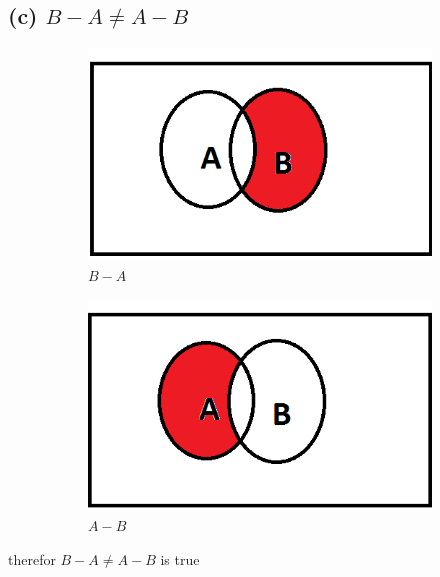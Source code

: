 \documentclass[a4paper,11pt]{report}
\begin{document}
\subsection*{(c) $B-A \neq A-B$}
\begin{figure}[h]
    \centering
    \begin{subfigure}[b]{0.25\textwidth}
        \includegraphics[width=\textwidth]{B-A}
        \caption{$B-A$}
    \end{subfigure}
    \begin{subfigure}[b]{0.25\textwidth}
        \includegraphics[width=\textwidth]{A-B}
        \caption{$ A-B$}
    \end{subfigure}
    \caption{}
\end{figure}
therefor $B-A \neq A-B$ is true
\newpage
\end{document}
